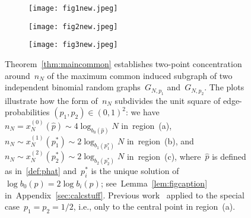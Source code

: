 \documentclass{article}
\newcommand{\xone}{x^{(1)}}
\newcommand{\xtwo}{x^{(2)}}
\newcommand{\xot}{x^{(0)}}
\newcommand{\nN}{n_N}
\newcommand{\ps}{\hat{p}}
\begin{document}
\begin{figure}
\centering
\begin{subfigure}{.29\textwidth}
\centering
\texttt{[image: fig1new.jpeg]}\hspace{.8em}
\caption[]{}
\label{fig:region1}
\end{subfigure}
\begin{subfigure}{.29\textwidth}
\centering
\texttt{[image: fig2new.jpeg]}\hspace{.8em}
\caption[]{}
\label{fig:region2}
\end{subfigure}
\begin{subfigure}{.29\textwidth}
\centering
\texttt{[image: fig3new.jpeg]}\hspace{.8em}
\caption[]{}
\label{fig:region3}
\end{subfigure}
\captionsetup{singlelinecheck=off}
\vspace{-0.5em}\caption{Theorem~\ref{thm:maincommon} establishes two-point concentration around~$n_N$ of the maximum common induced subgraph of two independent binomial random graphs~$G_{N,p_1}$ and~$G_{N,p_2}$. The plots illustrate how the form of~$n_N$ subdivides the unit square of edge-probabilities ${(p_1,p_2)\in (0,1)^2}$: 
we have ${\nN= \xot_N(\ps)\sim 4\log_{b_0(\hat{p})} N}$ in~region~(a), 
${\nN\sim \xone_N(p^*_1) \sim 2\log_{b_1(p^*_1)}N}$ in~region~(b), 
and ${\nN\sim \xtwo_N(p^*_2) \sim 2\log_{b_2(p^*_2)}N}$ in~region~(c), 
where~$\ps$ is defined as in~\eqref{def:phat} and~$p^*_i$ is the unique solution of~$\log b_0(p)=2\log b_i(p)$; 
see~Lemma~\ref{lem:figcaption} in~Appendix~\ref{sec:calcstuff}. 
Previous work~\cite{chatterjee2021isomorphisms} applied to the special case~$p_1=p_2=1/2$, i.e., only to the central point in region~(a).\label{fig:regions}}
\end{figure} 
\end{document}
